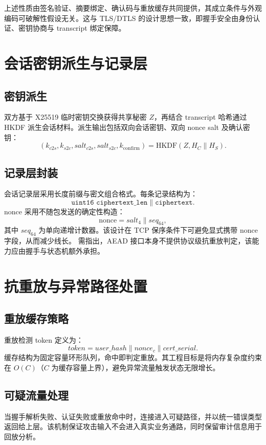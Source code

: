 上述性质由签名验证、摘要绑定、确认码与重放缓存共同提供，其成立条件与外观编码可破解性假设无关。这与 TLS/DTLS 的设计思想一致，即握手安全由身份认证、密钥协商与 transcript 绑定保障\cite{rfc8446,rfc9147}。

\section{会话密钥派生与记录层}
\subsection{密钥派生}
双方基于 X25519 临时密钥交换获得共享秘密 $Z$，再结合 transcript 哈希通过 HKDF 派生会话材料。派生输出包括双向会话密钥、双向 nonce salt 及确认密钥：
\[
\left(k_{c2s},k_{s2c},salt_{c2s},salt_{s2c},k_{\mathrm{confirm}}\right)=\mathrm{HKDF}(Z, H_C\parallel H_S).
\]

\subsection{记录层封装}
会话记录层采用长度前缀与密文组合格式。每条记录结构为：
\[
\texttt{uint16 ciphertext\_len} \parallel \texttt{ciphertext}.
\]
nonce 采用不随包发送的确定性构造：
\[
\mathrm{nonce} = salt_4 \parallel seq_{64},
\]
其中 $seq_{64}$ 为单向递增计数器。该设计在 TCP 保序条件下可避免显式携带 nonce 字段，从而减少线长。
需指出，AEAD 接口本身不提供协议级抗重放判定，该能力应由握手与状态机额外承担\cite{rfc5116}。

\section{抗重放与异常路径处置}
\subsection{重放缓存策略}
重放检测 token 定义为：
\[
token = user\_hash \parallel nonce_c \parallel cert\_serial.
\]
缓存结构为固定容量环形队列，命中即判定重放。其工程目标是将内存复杂度约束在 $O(C)$（$C$ 为缓存容量上界），避免异常流量触发状态无限增长。

\subsection{可疑流量处理}
当握手解析失败、认证失败或重放命中时，连接进入可疑路径，并以统一错误类型返回给上层。该机制保证攻击输入不会进入真实业务通路，同时保留审计信息用于回放分析。

